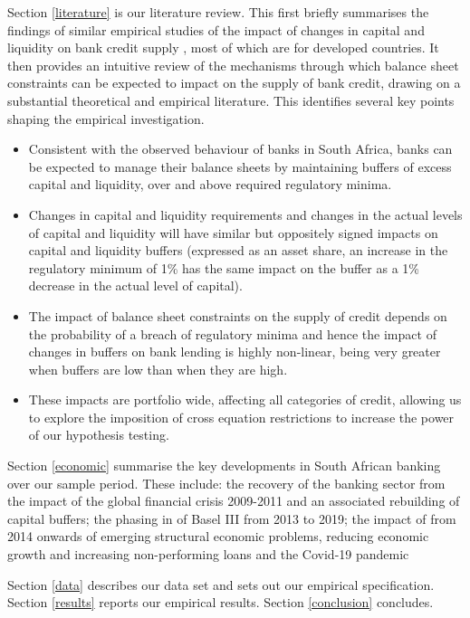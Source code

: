 \documentclass[
]{article}
\begin{document}
Section \ref{literature} is our literature review. This first briefly summarises the findings of similar empirical studies of the impact of changes in capital and liquidity on bank credit supply , most of which are for developed countries. It then provides an intuitive review of the mechanisms through which balance sheet constraints can be expected to impact on the supply of bank credit, drawing on a substantial theoretical and empirical literature. This identifies several key points shaping the empirical investigation.

\begin{itemize}
    \item Consistent with the observed behaviour of banks in South Africa, banks can be expected to manage their balance sheets by maintaining buffers of excess capital and liquidity, over and above required regulatory minima.
    \item Changes in capital and liquidity requirements and changes in the actual levels of capital and liquidity will have similar but oppositely signed impacts on capital and liquidity buffers (expressed as an asset share, an increase in the regulatory minimum of 1\% has the same impact on the buffer as a 1\% decrease in the actual level of capital). 
    \item The impact of balance sheet constraints on the supply of credit depends on the probability of a breach of regulatory minima and hence the impact of changes in buffers on bank lending is highly non-linear, being very greater when buffers are low than when they are high. 
    \item These impacts are portfolio wide, affecting all categories of credit, allowing us to explore the imposition of cross equation restrictions to increase the power of our hypothesis testing.  
\end{itemize}

Section \ref{economic} summarise the key developments in South African banking over our sample period. These include: the recovery of the banking sector from the impact of the global financial crisis 2009-2011 and an associated rebuilding of capital buffers; the phasing in of Basel III from 2013 to 2019; the impact of from 2014 onwards of emerging structural economic problems, reducing economic growth and increasing non-performing loans and the Covid-19 pandemic

Section \ref{data} describes our data set and sets out our empirical specification. Section \ref{results} reports our empirical results. Section \ref{conclusion} concludes.
\end{document}

